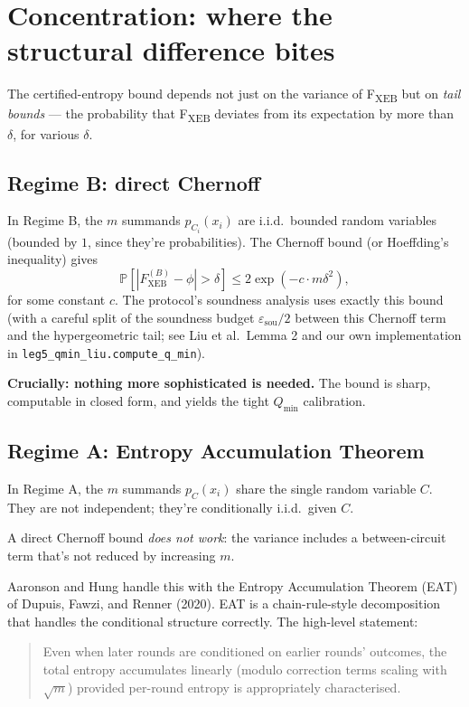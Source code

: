 \documentclass[11pt]{article}
\theoremstyle{definition}
\theoremstyle{remark}
\renewcommand{\Pr}{\mathbb{P}}
\newcommand{\eps}{\varepsilon}
\begin{document}
\section{Concentration: where the structural difference bites}
\label{sec:concentration}

The certified-entropy bound depends not just on the variance of
F\textsubscript{XEB} but on \emph{tail bounds} --- the probability that
F\textsubscript{XEB} deviates from its expectation by more than $\delta$,
for various $\delta$.

\subsection{Regime B: direct Chernoff}

In Regime B, the $m$ summands $p_{C_i}(x_i)$ are i.i.d.\ bounded random
variables (bounded by $1$, since they're probabilities). The Chernoff
bound (or Hoeffding's inequality) gives
\begin{equation}
  \Pr[|F_{\mathrm{XEB}}^{(B)} - \phi| > \delta] \leq 2 \exp(-c \cdot m
  \delta^2),
\end{equation}
for some constant $c$. The protocol's soundness analysis uses
exactly this bound (with a careful split of the soundness budget
$\eps_\mathrm{sou}/2$ between this Chernoff term and the hypergeometric
tail; see Liu et al.\ Lemma 2 and our own implementation in
\texttt{leg5\_qmin\_liu.compute\_q\_min}).

\textbf{Crucially: nothing more sophisticated is needed.} The bound is
sharp, computable in closed form, and yields the tight $Q_\mathrm{min}$
calibration.

\subsection{Regime A: Entropy Accumulation Theorem}

In Regime A, the $m$ summands $p_C(x_i)$ share the single random variable
$C$. They are not independent; they're conditionally i.i.d.\ given $C$.

A direct Chernoff bound \emph{does not work}: the variance includes a
between-circuit term that's not reduced by increasing $m$.

Aaronson and Hung handle this with the Entropy Accumulation Theorem (EAT)
of Dupuis, Fawzi, and Renner (2020). EAT is a chain-rule-style decomposition
that handles the conditional structure correctly. The high-level statement:
\begin{quote}
Even when later rounds are conditioned on earlier rounds' outcomes, the
total entropy accumulates linearly (modulo correction terms scaling with
$\sqrt{m}$) provided per-round entropy is appropriately characterised.
\end{quote}
\end{document}
